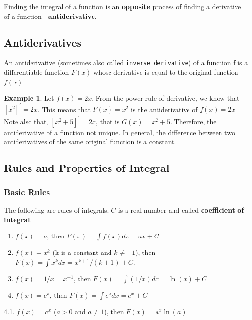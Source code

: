 \documentclass[
]{book}
\begin{document}
Finding the integral of a function is an \textbf{opposite} process of finding a derivative of a function - \textbf{antiderivative}.

\hypertarget{antiderivatives-1}{%
\subsection{Antiderivatives}\label{antiderivatives-1}}

An antiderivative (sometimes also called \texttt{inverse\ derivative}) of a function f is a differentiable function \(F(x)\) whose derivative is equal to the original function \(f(x)\).

\textbf{Example 1}. Let \(f(x) = 2x\). From the power rule of derivative, we know that \([x^2]^\prime = 2x\). This means that \(F(x) = x^2\) is the antiderivative of \(f(x) = 2x\). Note also that, \([x^2 + 5]^\prime = 2x\), that is \(G(x) = x^2 +5\). Therefore, the antiderivative of a function not unique. In general, the difference between two antiderivatives of the same original function is a constant.

\hypertarget{rules-and-properties-of-integral-1}{%
\subsection{Rules and Properties of Integral}\label{rules-and-properties-of-integral-1}}

\hypertarget{basic-rules-1}{%
\subsubsection{Basic Rules}\label{basic-rules-1}}

The following are rules of integrals. \(C\) is a real number and called \textbf{coefficient of integral}.

\begin{enumerate}
\def\labelenumi{\arabic{enumi}.}
\item
  \(f(x) = a\), then \(F(x) = \int f(x)dx = ax + C\)
\item
  \(f(x) = x^k\) (k is a constant and \(k \ne -1\)), then \(F(x) = \int x^k dx = x^{k+1}/(k+1) + C.\)
\item
  \(f(x) = 1/x = x^{-1}\), then \(F(x) = \int (1/x) dx = \ln(x) + C\)
\item
  \(f(x) = e^x\), then \(F(x) = \int e^x dx = e^x +C\)
\end{enumerate}

4.1. \(f(x) = a^x\) (\(a > 0\) and \(a \ne 1\)), then \(F(x) = a^x \ln(a)\)
\end{document}
